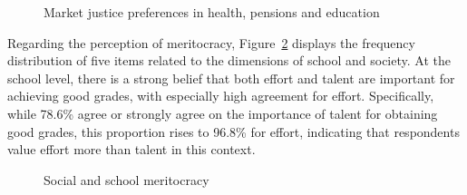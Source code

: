 \documentclass[
  12pt,
  letterpaper,
]{article}
\begin{document}
\begin{figure}


\caption{\label{fig-marketjustice}Market justice preferences in health,
pensions and education}

\end{figure}%

Regarding the perception of meritocracy, Figure~\ref{fig-meritocracy}
displays the frequency distribution of five items related to the
dimensions of school and society. At the school level, there is a strong
belief that both effort and talent are important for achieving good
grades, with especially high agreement for effort. Specifically, while
78.6\% agree or strongly agree on the importance of talent for obtaining
good grades, this proportion rises to 96.8\% for effort, indicating that
respondents value effort more than talent in this context.

\begin{figure}


\caption{\label{fig-meritocracy}Social and school meritocracy}

\end{figure}%
\end{document}
